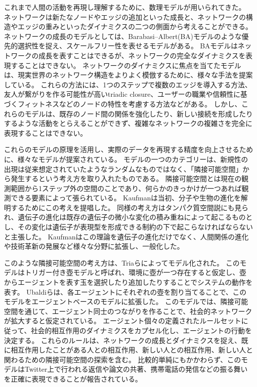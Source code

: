 \documentclass[uplatex,11pt,openany]{ujreport}
\begin{document}
    これまで人間の活動を再現し理解するために、数理モデルが用いられてきた。
    ネットワークは新たなノードやエッジの追加といった成長と、ネットワークの構造やエッジの重みといったダイナミクスの二つの側面から考えることができる。
    ネットワークの成長のモデルとしては、Barabasi--Albert(BA)モデルのような優先的選択性を捉え、スケールフリー性を表せるモデルがある\cite{barabasiEmergenceScalingRandom1999, barabasiOriginBurstsHeavy2005,barabasiScaleFreeNetworksDecade2009}。
    BAモデルはネットワークの成長を表すことはできるが、ネットワークの完全なダイナミクスを表現することはできない。
    ネットワークのダイナミクスに焦点を当てたモデルは、現実世界のネットワーク構造をよりよく模倣するために、様々な手法を提案している。
    これらの方法には、1つのステップで複数のエッジを導入する方法\cite{albertTopologyEvolvingNetworks2000}、友人が繋がりを作る可能性が高いtriadic closure\cite{bianconiTriadicClosureBasic2014}、ユーザーの職業や信頼性に基づくフィットネスなどのノードの特性を考慮する方法\cite{topirceanuWeightedBetweennessPreferential2018}などがある。
    しかし、これらのモデルは、既存のノード間の関係を強化したり、新しい接続を形成したりするような活動をとらえることができず、複雑なネットワークの複雑さを完全に表現することはできない。

    これらのモデルの原理を活用し、実際のデータを再現する精度を向上させるために、様々なモデルが提案されている。
    モデルの一つのカテゴリーは、新規性の出現は従来想定されていたようなランダムなものではなく、「隣接可能空間」から発生するという考え方を取り入れたものである\cite{monechiWavesNoveltiesExpansion2017,sudaExplorationExploitationAdjacent2022, ubaldiEmergenceEvolutionSocial2021}。
    隣接可能空間とは現在の観測範囲から1ステップ外の空間のことであり、何らかのきっかけが一つあれば観測できる要素によって張られている。
    Kaufmanは当初、分子や生物の進化を解明するためにこの考えを提唱した\cite{kauffmanOriginsOrderSelforganization1993}。
    同様の考え方はタンパク質空間説にも見られ、遺伝子の進化は既存の遺伝子の微小な変化の積み重ねによって起こるものとし、その変化は遺伝子が表現型を形成できる制約の下で起こらなければならないと主張した\cite{maynardsmithNaturalSelectionConcept1970}。
    Kaufmanはこの理論を遺伝子の進化だけでなく、人間関係の進化や技術革新の発展など様々な分野に拡張し、一般化した。

    このような隣接可能空間の考え方は、Triaら\cite{triaDynamicsCorrelatedNovelties2014}によってモデル化された。
    このモデルはトリガー付き壺モデルと呼ばれ、環境に壺が一つ存在すると仮定し、壺からエージェントを表す玉を選択したり追加したりすることでシステムの動作を表す。
    Ubaldiらは、各エージェントにそれぞれの壺を割り当てることで、このモデルをエージェントベースのモデルに拡張した\cite{ubaldiEmergenceEvolutionSocial2021}。
    このモデルでは、隣接可能空間を通じて、エージェント同士のつながりを作ることで、社会的ネットワークが拡大すると仮定されている。
    エージェント個々の定義されたルールセットに従って、社会的相互作用のダイナミクスをカプセル化し、エージェントの行動を決定する。
    これらのルールは、ネットワークの成長とダイナミクスを捉え、既に相互作用したことがある人との相互作用、新しい人との相互作用、新しい人と関わるための隣接可能空間の探索を含む。
    比較的単純にもかかわらず、このモデルはTwitter上で行われる返信や論文の共著、携帯電話の発信などの振る舞いを正確に表現できることが報告されている\cite{ubaldiEmergenceEvolutionSocial2021}。
\end{document}
